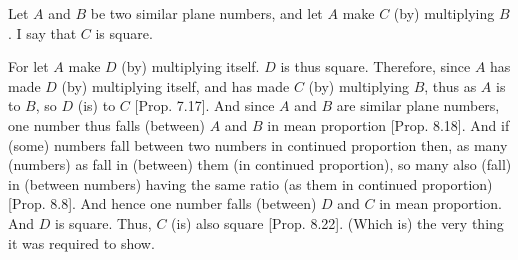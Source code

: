 \begin{Parallel}{}{}
{Let $A$ and $B$ be two similar plane numbers, and let $A$ make $C$
(by) multiplying $B$. I say that $C$ is square.

For let $A$ make $D$ (by) multiplying itself. $D$ is thus square. Therefore, since $A$ has made $D$ (by) multiplying itself, and
has made $C$ (by) multiplying $B$, thus as $A$ is to $B$, so $D$ (is) to $C$ [Prop. 7.17]. And since $A$ and $B$ are similar
plane numbers, one number thus falls (between) $A$ and $B$ in mean
proportion [Prop. 8.18]. And if (some) numbers fall between two  numbers in continued proportion then, as many (numbers)
as fall in  (between) them (in continued proportion), so many also (fall) in (between numbers) having
the same ratio (as them in continued proportion)  [Prop. 8.8].
And hence one number falls (between) $D$ and $C$ in mean proportion.
And $D$ is  square. Thus, $C$ (is) also  square [Prop. 8.22]. (Which is)
the very thing it was required to show.}
\end{Parallel}

